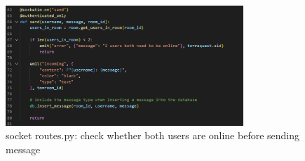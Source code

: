 \documentclass[12pt]{article}
\begin{document}
        \begin{figure}[H]
            \centering
            \includegraphics[width=0.8\textwidth]{zzrgraphs/socket_send.png}
            \caption{socket routes.py: check whether both users are online before sending message}
            \label{send}
        \end{figure}  
\end{document}
